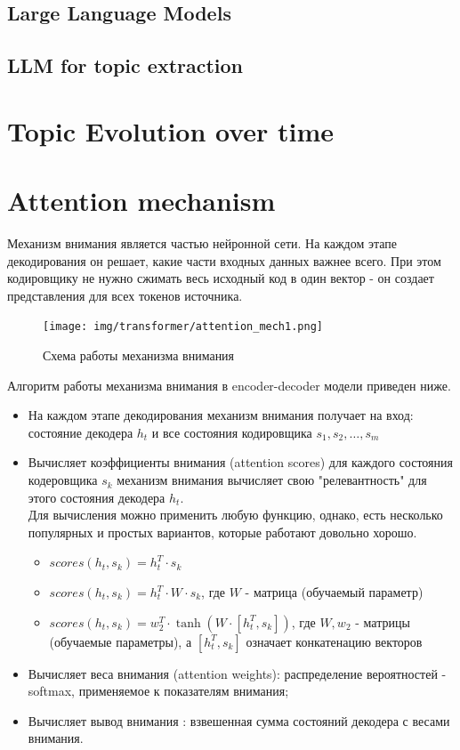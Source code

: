 \documentclass[PMI,VKR]{HSEUniversity}
\begin{document}
\subsection{Large Language Models}


\subsection{LLM for topic extraction}


\section{Topic Evolution over time}



\section{Attention mechanism}

Механизм внимания является частью нейронной сети. На каждом этапе декодирования он решает, какие части входных данных важнее всего. При этом кодировщику не нужно сжимать весь исходный код в один вектор - он создает представления для всех токенов источника.

\begin{figure}[h]
    \centering
    \texttt{[image: img/transformer/attention\_mech1.png]}
    \caption{Схема работы механизма внимания}
\end{figure}

\newpage
Алгоритм работы механизма внимания в encoder-decoder модели приведен ниже.

\begin{itemize}
    \item На каждом этапе декодирования механизм внимания получает на вход: состояние декодера $h_t$ и все состояния кодировщика $s_1, s_2, \dots, s_m$
    \item Вычисляет коэффициенты внимания (attention scores) для каждого состояния кодеровщика $s_k$ механизм внимания вычисляет свою "релевантность" для этого состояния декодера $h_t$. \\
          Для вычисления можно применить любую функцию, однако, есть несколько популярных и простых вариантов, которые работают довольно хорошо.
          \begin{itemize}
              \item $scores(h_t, s_k) = h_t^T \cdot s_k $
              \item $scores(h_t, s_k) = h_t^T \cdot W \cdot s_k $, где $W$ - матрица (обучаемый параметр)
              \item $scores(h_t, s_k) = w_2^T \cdot \tanh(W \cdot [h_t^T, s_k]) $, где $W, w_2$ - матрицы (обучаемые параметры), а $[h_t^T, s_k]$ означает конкатенацию векторов
          \end{itemize}

    \item Вычисляет веса внимания (attention weights): распределение вероятностей - softmax, применяемое к показателям внимания;
    \item Вычисляет вывод внимания : взвешенная сумма состояний декодера с весами внимания.
\end{itemize}
\end{document}
